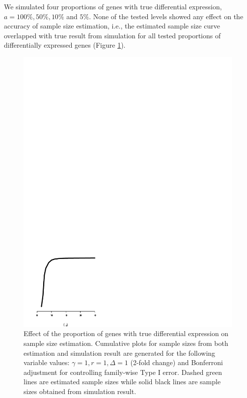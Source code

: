 \documentclass[12pt]{article}
\begin{document}
We simulated four proportions of genes with true differential
expression, $a = 100\%, 50\%, 10\%$ and $5\%$. None of the tested
levels showed any effect on the accuracy of sample size
estimation, i.e., the estimated sample size curve overlapped with
true result from simulation for all tested proportions of
differentially expressed genes (Figure \ref{fig:ResAlt}).

\begin{figure}%
  \caption[Effect of the proportion of genes with true differential
    expression on sample size estimation] {Effect of the proportion of
    genes with true differential expression on sample size estimation.
    Cumulative plots for sample sizes from both estimation and
    simulation result are generated for the following variable values:
    $\gamma = 1, r = 1, \Delta = 1$ (2-fold change) and Bonferroni
    adjustment for controlling family-wise Type I error. Dashed green
    lines are estimated sample sizes while solid black lines are
    sample sizes obtained from simulation result.}
  \label{fig:ResAlt}
  \centerline{\includegraphics*[width=\textwidth]{ResAlt.pdf}}
\end{figure}
\end{document}
